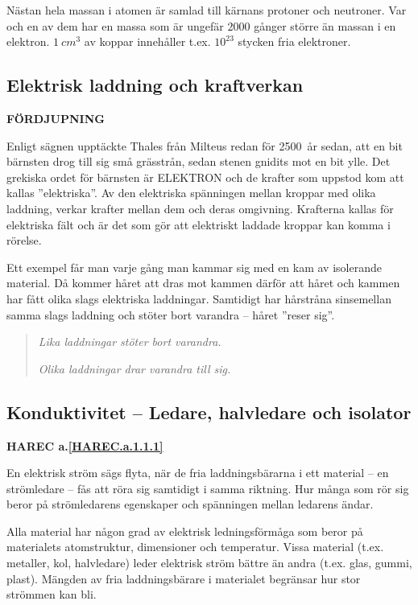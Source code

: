 Nästan hela massan i atomen är samlad till kärnans protoner och neutroner. Var
och en av dem har en massa som är ungefär 2000 gånger större än massan i en
elektron. \(1\ cm^3\) av koppar innehåller t.ex. \(10^{23}\) stycken fria
elektroner.

\subsection{Elektrisk laddning och kraftverkan}
\textbf{FÖRDJUPNING}

Enligt sägnen upptäckte Thales från Milteus redan för 2500~år sedan, att en bit
bärnsten drog till sig små grässtrån, sedan stenen gnidits mot en bit ylle. Det
grekiska ordet för bärnsten är ELEKTRON och de krafter som uppstod kom att
kallas ''elektriska''. Av den elektriska spänningen mellan kroppar med olika
laddning, verkar krafter mellan dem och deras omgivning. Krafterna kallas för
elektriska fält och är det som gör att elektriskt laddade kroppar kan komma i
rörelse.

Ett exempel får man varje gång man kammar sig med en kam av isolerande
material. Då kommer håret att dras mot kammen därför att håret och kammen har
fått olika slags elektriska laddningar. Samtidigt har hårstråna sinsemellan
samma slags laddning och stöter bort varandra -- håret ''reser sig''.

\begin{quote}
\emph{Lika laddningar stöter bort varandra.}

\emph{Olika laddningar drar varandra till sig.}
\end{quote}

\subsection{Konduktivitet -- Ledare, halvledare och isolator}
\textbf{HAREC a.\ref{HAREC.a.1.1.1}\label{myHAREC.a.1.1.1}}

En elektrisk ström sägs flyta, när de fria laddningsbärarna i ett material -- en
strömledare -- fås att röra sig samtidigt i samma riktning. Hur många som rör
sig beror på strömledarens egenskaper och spänningen mellan ledarens ändar.

Alla material har någon grad av elektrisk ledningsförmåga som beror på
materialets atomstruktur, dimensioner och temperatur. Vissa material (t.ex.
metaller, kol, halvledare) leder elektrisk ström bättre än andra (t.ex. glas,
gummi, plast). Mängden av fria laddningsbärare i materialet begränsar hur
stor strömmen kan bli.

